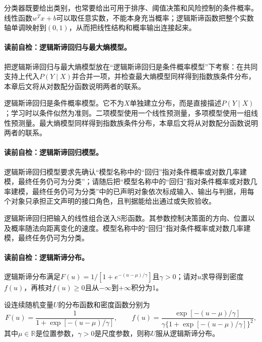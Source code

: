 \label{struct:V2-C05-CH06}
分类器既要给出类别，也常要给出可用于排序、阈值决策和风险控制的条件概率。线性函数$w^Tx+b$可以取任意实数，不能本身充当概率；逻辑斯谛函数把整个实数轴单调映射到$(0,1)$，从而把线性结构和概率输出连接起来。

\paragraph{读前自检：逻辑斯谛回归与最大熵模型。}把逻辑斯谛回归与最大熵模型放在“逻辑斯谛回归是条件概率模型”下考察：在共同支持上代入$P(Y\mid X)$并合并一项，并检查最大熵模型同样得到指数族条件分布，本章后文将从对数配分函数说明两者的联系。\par

逻辑斯谛回归是条件概率模型。它不为$X$单独建立分布，而是直接描述$P(Y\mid X)$；学习时以条件似然为准则。二项模型使用一个线性预测量，多项模型使用一组线性预测量。最大熵模型同样得到指数族条件分布，本章后文将从对数配分函数说明两者的联系。

\paragraph{读前自检：逻辑斯谛回归模型。}逻辑斯谛回归模型要求先确认“模型名称中的“回归”指对条件概率或对数几率建模，最终任务仍可为分类”；请随后把“模型名称中的“回归”指对条件概率或对数几率建模，最终任务仍可为分类”中的已声明对象依次标成输入、输出与判据，用每个对象只承担正文声明的接口角色，且判据能给出通过或失败验收。\par

逻辑斯谛回归把输入的线性组合送入S形函数。其参数控制决策面的方向、位置以及概率随法向距离变化的速度。模型名称中的“回归”指对条件概率或对数几率建模，最终任务仍可为分类。

\paragraph{读前自检：逻辑斯谛分布。}逻辑斯谛分布满足$F(u)=1/[1+e^{-(u-\mu)/\gamma}]$且$\gamma>0$；请对$u$求导得到密度$f(u)$，再核对$f(u)\ge0$且从$-\infty$到$+\infty$积分为1。\par

\label{struct:V2-C05-CH07}
\begin{definition}[逻辑斯谛分布]\label{def:V2-C05-logistic-distribution}
设连续随机变量$U$的分布函数和密度函数分别为
\[
F(u)=\frac{1}{1+\exp[-(u-\mu)/\gamma]},\qquad
f(u)=\frac{\exp[-(u-\mu)/\gamma]}
{\gamma\{1+\exp[-(u-\mu)/\gamma]\}^{2}},
\]
其中$\mu\in\mathbb R$是位置参数，$\gamma>0$是尺度参数，则称$U$服从逻辑斯谛分布。
\end{definition}


